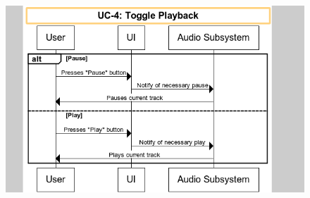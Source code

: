 \documentclass[letterpaper,english, 12pt]{scrreprt}
\begin{document}
\begin{figure}[H]
        \centering
        \includegraphics[width=\textwidth]{img/ssd/ssd_uc4.png}\\
\end{figure}
\end{document}
